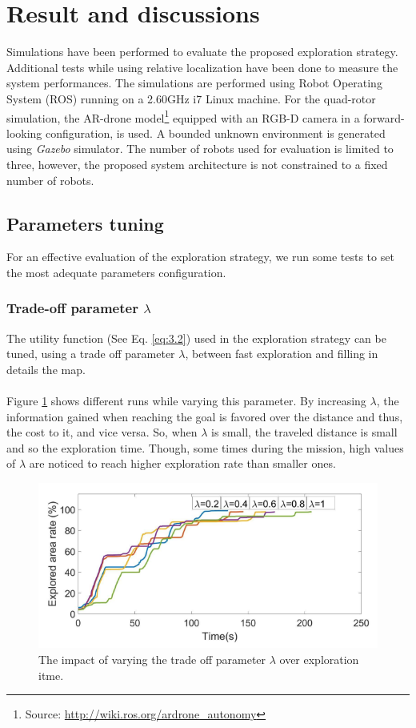 \documentclass[11pt,openany]{book}
\begin{document}
\section{Result and discussions}
Simulations have been performed to evaluate the proposed exploration strategy. Additional tests while using relative localization have been done to measure the system performances. The simulations are performed using Robot Operating System (ROS) running on a 2.60GHz i7 Linux machine. For the quad-rotor simulation, the AR-drone model\footnote{Source: \url{http://wiki.ros.org/ardrone_autonomy}} equipped with an RGB-D camera in a forward-looking configuration, is used. A bounded unknown environment is generated using \textit{Gazebo} simulator. The number of robots used for evaluation is limited to three, however, the proposed system architecture is not constrained to a fixed number of robots.
\subsection{Parameters tuning}
For an effective evaluation of the exploration strategy, we run some tests to set the most adequate parameters configuration.
\subsubsection{Trade-off parameter $\lambda$}
The utility function (See Eq. \ref{eq:3.2}) used in the exploration strategy can be tuned, using a trade off parameter $\lambda$, between fast exploration and filling in details the map.\\\\
Figure \ref{fig:3.11} shows different runs while varying this parameter. By increasing $\lambda$, the information gained when reaching the goal is favored over the distance and thus, the cost to it, and vice versa. So, when $\lambda$ is small, the traveled distance is small and so the exploration time. Though, some times during the mission, high values of $\lambda$ are noticed to reach higher exploration rate than smaller ones.
\begin{figure}[H]
    \centering
    \includegraphics[scale=0.5]{assets/3_11.png}
    \caption{The impact of varying the trade off parameter $\lambda$ over exploration itme.}
    \label{fig:3.11}
\end{figure}
\end{document}
